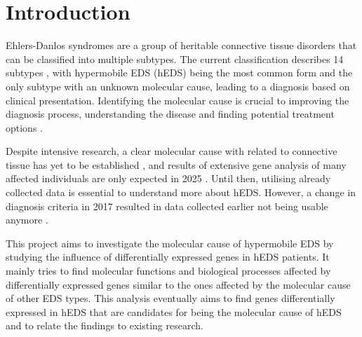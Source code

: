 \section{Introduction}


Ehlers-Danlos syndromes are a group of heritable connective tissue disorders that can be classified into multiple subtypes. The current classification describes 14 subtypes \cite{classification2017, Malfait2020}, with hypermobile EDS (hEDS) being the most common form and the only subtype with an unknown molecular cause, leading to a diagnosis based on clinical presentation. Identifying the molecular cause is crucial to improving the diagnosis process, understanding the disease and finding potential treatment options \cite{Ritelli2020}.

Despite intensive research, a clear molecular cause with related to connective tissue has yet to be established \cite{Caliogna2021}, and results of extensive gene analysis of many affected individuals are only expected in 2025 \cite{HEDGE}. Until then, utilising already collected data is essential to understand more about hEDS. However, a change in diagnosis criteria in 2017 resulted in data collected earlier not being usable anymore \cite{Gensemer2021, Ritelli2022}.

This project aims to investigate the molecular cause of hypermobile EDS by studying the influence of differentially expressed genes in hEDS patients. It mainly tries to find molecular functions and biological processes affected by differentially expressed genes similar to the ones affected by the molecular cause of other EDS types. This analysis eventually aims to find genes differentially expressed in hEDS that are candidates for being the molecular cause of hEDS and to relate the findings to existing research.